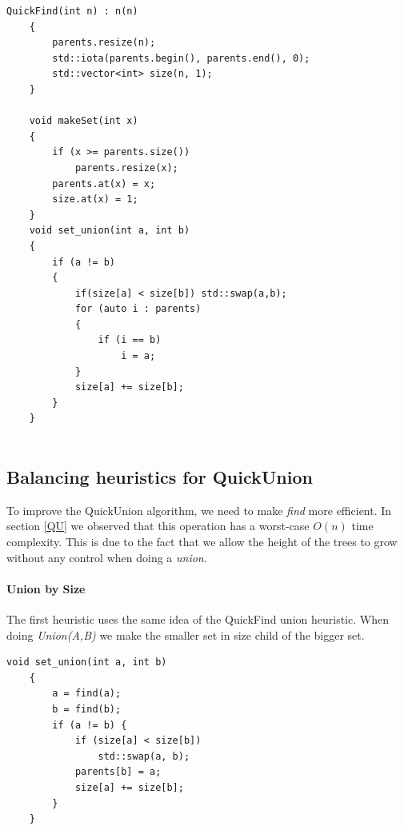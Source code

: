 \documentclass{article}
\begin{document}
\begin{lstlisting}[caption=updated operations in QuickFind, label=lab:qfu]
    QuickFind(int n) : n(n)
    {
        parents.resize(n);
        std::iota(parents.begin(), parents.end(), 0);
        std::vector<int> size(n, 1);
    }

    void makeSet(int x)
    {
        if (x >= parents.size())
            parents.resize(x);
        parents.at(x) = x;
        size.at(x) = 1;
    }
    void set_union(int a, int b)
    {
        if (a != b)
        {
            if(size[a] < size[b]) std::swap(a,b);
            for (auto i : parents)
            {
                if (i == b)
                    i = a;
            }
            size[a] += size[b];
        }
    }
    
\end{lstlisting}
\subsection{Balancing heuristics for QuickUnion}
To improve the QuickUnion algorithm, we need to make \emph{find} more efficient.
In section \ref{QU} we observed that this operation has a worst-case $O(n)$ time complexity.
This is due to the fact that we allow the height of the trees to grow without any control when 
doing a \emph{union}. 
\paragraph{Union by Size}
The first heuristic uses the same idea of the QuickFind union heuristic. When doing \emph{Union(A,B)}
we make the smaller set in size child of the bigger set.
\begin{lstlisting}[caption=Union by size implementation, label=quu]
    void set_union(int a, int b)
    {
        a = find(a);
        b = find(b);
        if (a != b) {
            if (size[a] < size[b])
                std::swap(a, b);
            parents[b] = a;
            size[a] += size[b];
        }
    }

\end{lstlisting}
\end{document}
